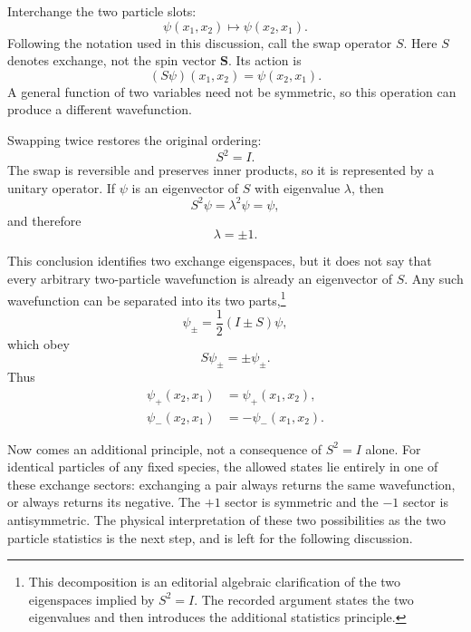 Interchange the two particle slots:
\begin{equation}
\psi(x_{1},x_{2})\longmapsto\psi(x_{2},x_{1}).
\end{equation}
Following the notation used in this discussion, call the swap operator \(S\). Here \(S\) denotes exchange, not the spin vector \(\mathbf S\). Its action is
\begin{equation}
(S\psi)(x_{1},x_{2})=\psi(x_{2},x_{1}).
\end{equation}
A general function of two variables need not be symmetric, so this operation can produce a different wavefunction.

Swapping twice restores the original ordering:
\begin{equation}
S^{2}=I.
\end{equation}
The swap is reversible and preserves inner products, so it is represented by a unitary operator. If \(\psi\) is an eigenvector of \(S\) with eigenvalue \(\lambda\), then
\[
S^{2}\psi=\lambda^{2}\psi=\psi,
\]
and therefore
\begin{equation}
\lambda=\pm1.
\end{equation}

This conclusion identifies two exchange eigenspaces, but it does not say that every arbitrary two-particle wavefunction is already an eigenvector of \(S\). Any such wavefunction can be separated into its two parts,\footnote{This decomposition is an editorial algebraic clarification of the two eigenspaces implied by \(S^{2}=I\). The recorded argument states the two eigenvalues and then introduces the additional statistics principle.}
\begin{equation}
\psi_{\pm}=\frac12(I\pm S)\psi,
\end{equation}
which obey
\begin{equation}
S\psi_{\pm}=\pm\psi_{\pm}.
\end{equation}
Thus
\begin{align}
\psi_{+}(x_{2},x_{1})&=\psi_{+}(x_{1},x_{2}),\\
\psi_{-}(x_{2},x_{1})&=-\psi_{-}(x_{1},x_{2}).
\end{align}

Now comes an additional principle, not a consequence of \(S^{2}=I\) alone. For identical particles of any fixed species, the allowed states lie entirely in one of these exchange sectors: exchanging a pair always returns the same wavefunction, or always returns its negative. The \(+1\) sector is symmetric and the \(-1\) sector is antisymmetric. The physical interpretation of these two possibilities as the two particle statistics is the next step, and is left for the following discussion.
